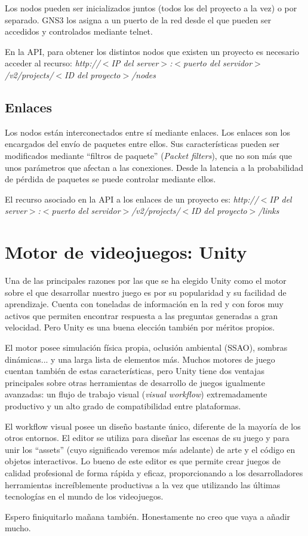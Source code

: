 Los nodos pueden ser inicializados juntos (todos los del proyecto a la vez) o por separado. GNS3 los asigna a un puerto de la red desde el que pueden ser accedidos y controlados mediante telnet.

En la API, para obtener los distintos nodos que existen un proyecto es necesario acceder al recurso: \textit{http://$<$IP del server$>$:$<$puerto del servidor$>$/v2/projects/$<$ID del proyecto$>$/nodes}

\subsection{Enlaces}
Los nodos están interconectados entre sí mediante enlaces. Los enlaces son los encargados del envío de paquetes entre ellos. Sus características pueden ser modificados mediante ``filtros de paquete'' (\textit{Packet filters}), que no son más que unos parámetros que afectan a las conexiones. Desde la latencia a la probabilidad de pérdida de paquetes se puede controlar mediante ellos.

El recurso asociado en la API a los enlaces de un proyecto es: \textit{http://$<$IP del server$>$:$<$puerto del servidor$>$/v2/projects/$<$ID del proyecto$>$/links}
 
\section{Motor de videojuegos: Unity}
Una de las principales razones por las que se ha elegido Unity como el motor sobre el que desarrollar nuestro juego es por su popularidad y su facilidad de aprendizaje. Cuenta con toneladas de información en la red y con foros muy activos que permiten encontrar respuesta a las preguntas generadas a gran velocidad. Pero Unity es una buena elección también por méritos propios.

El motor posee simulación física propia, oclusión ambiental (SSAO), sombras dinámicas... y una larga lista de elementos más. Muchos motores de juego cuentan también de estas características, pero Unity tiene dos ventajas principales sobre otras herramientas de desarrollo de juegos igualmente avanzadas: un flujo de trabajo visual (\textit{visual workflow}) extremadamente productivo y un alto grado de compatibilidad entre plataformas.

El workflow visual posee un diseño bastante único, diferente de la mayoría de los otros entornos. El editor se utiliza para diseñar las escenas de su juego y para unir los ``assets'' (cuyo significado veremos más adelante) de arte y el código en objetos interactivos. Lo bueno de este editor es que permite crear juegos de calidad profesional de forma rápida y eficaz, proporcionando a los desarrolladores herramientas increíblemente productivas a la vez que utilizando las últimas tecnologías en el mundo de los videojuegos.


Espero finiquitarlo mañana también. Honestamente no creo que vaya a añadir mucho.